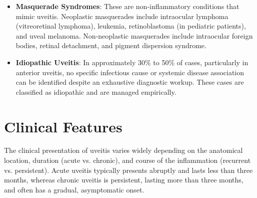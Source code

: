 \begin{itemize}
    \item \textbf{Masquerade Syndromes}: These are non-inflammatory conditions that mimic uveitis. Neoplastic masquerades include intraocular lymphoma (vitreoretinal lymphoma), leukemia, retinoblastoma (in pediatric patients), and uveal melanoma. Non-neoplastic masquerades include intraocular foreign bodies, retinal detachment, and pigment dispersion syndrome.
    \item \textbf{Idiopathic Uveitis}: In approximately 30\% to 50\% of cases, particularly in anterior uveitis, no specific infectious cause or systemic disease association can be identified despite an exhaustive diagnostic workup. These cases are classified as idiopathic and are managed empirically.
\end{itemize}

\section*{Clinical Features}
The clinical presentation of uveitis varies widely depending on the anatomical location, duration (acute vs. chronic), and course of the inflammation (recurrent vs. persistent). Acute uveitis typically presents abruptly and lasts less than three months, whereas chronic uveitis is persistent, lasting more than three months, and often has a gradual, asymptomatic onset.

